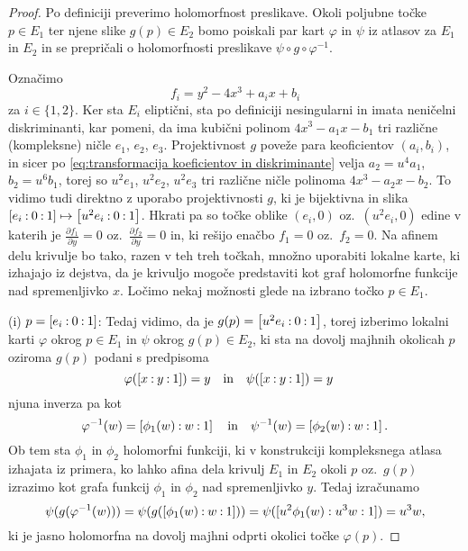 \documentclass[mat1]{fmfdelo}
\numberwithin{equation}{section}
\newcommand{\inv}{^{-1}}
\newcommand{\pcoor}[1]{%
\begingroup\lccode`~=`: \lowercase{\endgroup
\edef~}{\mathbin{\mathchar\the\mathcode`:}\nobreak}%
\left[%
\begingroup
\mathcode`:=\string"8000
#1%
\endgroup
\right]%
}
\newcommand{\pdv}[2][]{\frac{\partial#1}{\partial#2}}
\newcommand{\oz}{oz.\ }
\theoremstyle{definition}
\begin{document}
\begin{proof}
    Po definiciji preverimo holomorfnost preslikave. Okoli poljubne točke $p \in E_1$ ter njene slike $g(p) \in E_2$ bomo poiskali par kart $\varphi$ in $\psi$ iz atlasov za $E_1$ in $E_2$ in se prepričali o holomorfnosti preslikave $\psi \circ g \circ \varphi\inv$. 
    
    Označimo 
    \[
        f_i = y^2 - 4x^3 + a_ix + b_i
    \]
    za $i \in \{1,2\}$.
    Ker sta $E_i$ eliptični, sta po definiciji nesingularni in imata neničelni diskriminanti, kar pomeni, da ima kubični polinom $4x^3 - a_1x - b_1$ tri različne (kompleksne) ničle $e_1$, $e_2$, $e_3$. Projektivnost $g$ poveže para keoficientov $(a_i, b_i)$, in sicer po \eqref{eq:transformacija koeficientov in diskriminante} velja $a_2 = u^4 a_1$, $b_2 = u^6 b_1$, torej so $u^2e_1$, $u^2e_2$, $u^2e_3$ tri različne ničle polinoma $4x^3 - a_2x - b_2$. To vidimo tudi direktno z uporabo projektivnosti $g$, ki je bijektivna in slika $\pcoor{e_i : 0 : 1} \mapsto \pcoor{u^2 e_i : 0 : 1}$. Hkrati pa so točke oblike $(e_i, 0)$ \oz $(u^2 e_i, 0)$ edine v katerih je $\pdv[f_1]{y} = 0$ \oz $\pdv[f_2]{y} = 0$ in, ki rešijo enačbo $f_1 = 0$ \oz $f_2 = 0$. Na afinem delu krivulje bo tako, razen v teh treh točkah, množno uporabiti lokalne karte, ki izhajajo iz dejstva, da je krivuljo mogoče predstaviti kot graf holomorfne funkcije nad spremenljivko $x$. Ločimo nekaj možnosti glede na izbrano točko $p \in E_1$.

        (i) $p = \pcoor{e_i : 0 : 1}$: Tedaj vidimo, da je $g(p) = \pcoor{u^2 e_i : 0 : 1}$, torej izberimo lokalni karti $\varphi$ okrog $p \in E_1$ in $\psi$ okrog $g(p) \in E_2$, ki sta na dovolj majhnih okolicah $p$ oziroma $g(p)$ podani s predpisoma 
        \[
            \varphi(\pcoor{x : y : 1}) = y \quad \text{in} \quad
            \psi(\pcoor{x : y : 1}) = y \quad  
        \] 
        njuna inverza pa kot 
        \[
            \varphi\inv(w) = \pcoor{\phi_1(w) : w : 1} \quad \text{in} \quad
            \psi\inv(w) = \pcoor{\phi_2(w) : w : 1}.
        \]
        Ob tem sta $\phi_1$ in $\phi_2$ holomorfni funkciji, ki v konstrukciji kompleksnega atlasa izhajata iz primera, ko lahko afina dela krivulj $E_1$ in $E_2$ okoli $p$ \oz $g(p)$ izrazimo kot grafa funkcij $\phi_1$ in $\phi_2$ nad spremenljivko $y$. Tedaj izračunamo
        \[
            \psi(g(\varphi\inv(w))) = 
            \psi(g(\pcoor{\phi_1(w) : w : 1})) = 
            \psi([u^2\phi_1(w) : u^3w : 1]) = 
            u^3w,
        \]
        ki je jasno holomorfna na dovolj majhni odprti okolici točke $\varphi(p)$. 


\end{proof}
\end{document}
